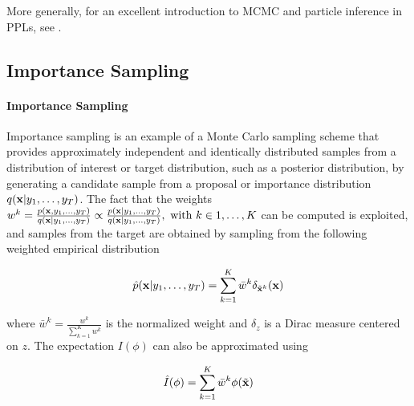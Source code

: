 More generally, for an excellent introduction to \gls{MCMC} and particle inference in \glspl{PPL}, see \cite{dippl}.


\subsection{Importance Sampling}

\paragraph{Importance Sampling}
Importance sampling is an example of a Monte Carlo sampling scheme that provides approximately independent and identically distributed samples from a distribution of interest or target distribution, such as a posterior distribution, by generating a candidate sample from a proposal or importance distribution $q(\boldsymbol{\mathbf{x}}|y_1,\dots,y_T)$.
The fact that the weights 
$w^k = \frac{p(\boldsymbol{\mathbf{x}}, y_1,\dots,y_T)}{q(\boldsymbol{\mathbf{x}}|y_1,\dots,y_T)} \propto \frac{p(\boldsymbol{\mathbf{x}}|y_1,\dots,y_T)}{q(\boldsymbol{\mathbf{x}}|y_1,\dots,y_T)}, \ \text{with} \ k \in 1,\dots,K$ can be computed is exploited, and samples from the target are obtained by sampling from the following weighted empirical distribution

$$ \hat{p}(\boldsymbol{\mathbf{x}}|y_1,\dots,y_T) = \sum_{k=1}^K \bar{w}^k \delta_{\tilde{\boldsymbol{\mathbf{x}}}^k} (\boldsymbol{\mathbf{x}})$$

where $\bar{w}^k = \frac{{w}^k}{\sum_{k=1}^K {w}^k}$ is the normalized weight and
$\delta_{z}$ is a Dirac measure centered on $z$.
The expectation $I(\phi)$ can also be approximated using

$$ \hat{I}(\phi) = \sum_{k=1}^K \bar{w}^k \phi(\tilde{\boldsymbol{\mathbf{x}}})$$


